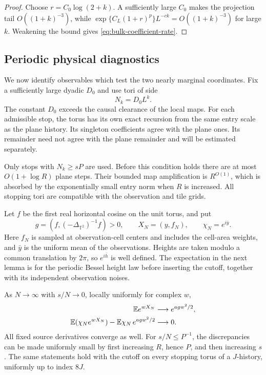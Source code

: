 \begin{proof}
Choose $r=C_0\log(2+k)$.  A sufficiently large $C_0$ makes the
projection tail $O((1+k)^{-3})$, while
$\exp\{C_L(1+r)^p\}L^{-ck}=O((1+k)^{-3})$ for large $k$.
Weakening the bound gives \eqref{eq:bulk-coefficient-rate}.
\end{proof}

\subsection{Periodic physical diagnostics}

We now identify observables which test the two nearly marginal
coordinates.  Fix a sufficiently large dyadic $D_0$ and use tori of
side
\begin{equation}\label{eq:bulk-stopping-tori}
 N_k=D_0L^k.
\end{equation}
The constant $D_0$ exceeds the causal clearance of the local maps.
For each admissible stop, the torus has its own exact recursion from
the same entry scale as the plane history.  Its singleton coefficients
agree with the plane ones.  Its remainder need not agree with the
plane remainder and will be estimated separately.

Only stops with $N_k\ge sP$ are used.  Before this condition holds
there are at most $O(1+\log R)$ plane steps.  Their bounded map
amplification is $R^{O(1)}$, which is absorbed by the exponentially
small entry norm when $R$ is increased.  All stopping tori are
compatible with the observation and tile grids.

Let $f$ be the first real horizontal cosine on the unit torus, and
put
\begin{equation}\label{eq:bulk-test-definitions}
 g=(f,(-\Delta_{\mathbb T^2})^{-1}f)>0,\qquad
 X_N=(y,f_N),\qquad \chi_N=e^{i\bar y}.
\end{equation}
Here $f_N$ is sampled at observation-cell centers and includes the
cell-area weights, and $\bar y$ is the uniform mean of the
observations.  Heights are taken modulo a common translation by
$2\pi$, so $e^{i\bar h}$ is well defined.  The expectation in the
next lemma is for the periodic Bessel height law before inserting
the cutoff, together with its independent observation noises.

\begin{lemma}
\label{lem:bulk-physical-diagnostics}
As $N\to\infty$ with $s/N\to0$, locally uniformly for complex $w$,
\begin{align}
 \mathbb E e^{wX_N}&\longrightarrow e^{agw^2/2},
 \label{eq:bulk-physical-gradient}\\
 \mathbb E(\chi_Ne^{wX_N})-\mathbb E\chi_N\,e^{agw^2/2}
 &\longrightarrow0.
 \label{eq:bulk-physical-phase}
\end{align}
All fixed source derivatives converge as well.  For $s/N\le P^{-1}$,
the discrepancies can be made uniformly small by first increasing
$R$, hence $P$, and then increasing $s$.  The same statements hold
with the cutoff on every stopping torus of a $J$-history, uniformly
up to index $8J$.
\end{lemma}

